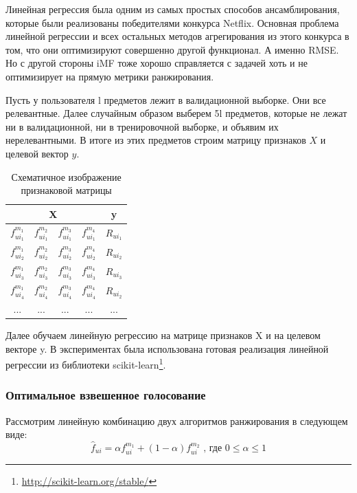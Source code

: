 \documentclass[14pt]{extarticle}
\begin{document}
Линейная регрессия была одним из самых простых способов ансамблирования, которые были реализованы победителями конкурса Netflix.  Основная  проблема линейной регрессии и всех остальных методов агрегирования из этого конкурса в том, что они оптимизируют совершенно другой функционал. А именно RMSE. Но с другой стороны iMF тоже хорошо справляется с  задачей хоть и не оптимизирует на прямую метрики ранжирования.

Пусть у пользователя l предметов лежит в валидационной выборке. Они все релевантные. Далее случайным образом выберем 5l предметов, которые не лежат ни в валидационной, ни в тренировочной выборке, и объявим их нерелевантными. В итоге из этих предметов строим матрицу признаков $X$ и целевой вектор $y$. 

\begin{table}[H]
\label{tab:schemetable}
\begin{center}
\begin{tabular}{|c|c|c|c|c|}
\hline
 \multicolumn{4}{|c|}{X} & \multicolumn{1}{|c|}{y}\\
\hline
  $f_{ui_1} ^ {m_1}$& $f_{ui_1} ^ {m_2}$ & $f_{ui_1} ^ {m_3}$& $f_{ui_1} ^ {m_4}$& $R_{ui_1}$ \\
\hline
$f_{ui_2} ^ {m_1}$& $f_{ui_2} ^ {m_2}$ & $f_{ui_2} ^ {m_3}$& $f_{ui_2} ^ {m_4}$& $R_{ui_2}$ \\
\hline
$f_{ui_3} ^ {m_1}$& $f_{ui_3} ^ {m_2}$ & $f_{ui_3} ^ {m_3}$& $f_{ui_3} ^ {m_4}$& $R_{ui_3}$ \\
\hline
$f_{ui_4} ^ {m_1}$& $f_{ui_4} ^ {m_2}$ & $f_{ui_4} ^ {m_3}$& $f_{ui_4} ^ {m_4}$& $R_{ui_2}$ \\
\hline
... & ... & ... &  ... & ... \\
\end{tabular}
\end{center}
\caption{Схематичное изображение признаковой матрицы}
\end{table} 

Далее обучаем  линейную регрессию на матрице признаков X и на целевом векторе y. В экспериментах была использована готовая реализация линейной регрессии из библиотеки scikit-learn\footnote{\url{http://scikit-learn.org/stable/}}.

\subsubsection*{Оптимальное взвешенное голосование} 
      Рассмотрим линейную комбинацию двух алгоритмов ранжирования  в следующем виде:
\begin{equation*}
	\hat{f}_{ui} = \alpha f_{ui}^{m_1} + (1 - \alpha) f_{ui} ^ {m_2} \textrm{\ , где $0 \leq \alpha \leq 1$} 
\end{equation*}
\end{document}
